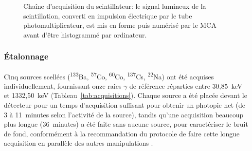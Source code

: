 \documentclass[11pt,letterpaper]{article}
\begin{document}
\begin{figure}[H]
    \centering
    \caption{Chaîne d'acquisition du scintillateur: le signal lumineux de la scintillation, converti en impulsion électrique par le tube photomultiplicateur, est mis en forme puis numérisé par le MCA avant d'être histogrammé par ordinateur.}
    \label{fig:montage}
\end{figure}

\subsubsection*{Étalonnage}
Cinq sources scellées (\textsuperscript{133}Ba, \textsuperscript{57}Co, \textsuperscript{60}Co, \textsuperscript{137}Cs, \textsuperscript{22}Na) ont été acquises individuellement, fournissant onze raies $\gamma$ de référence réparties entre 30,85~keV et 1332,50~keV (Tableau~\ref{tab:acquisitions}). Chaque source a été placée devant le détecteur pour un temps d'acquisition suffisant pour obtenir un photopic net (de 3 à 11~minutes selon l'activité de la source), tandis qu'une acquisition beaucoup plus longue (36~minutes) a été faite sans aucune source, pour caractériser le bruit de fond, conformément à la recommandation du protocole de faire cette longue acquisition en parallèle des autres manipulations \cite{protocole}.
\end{document}
